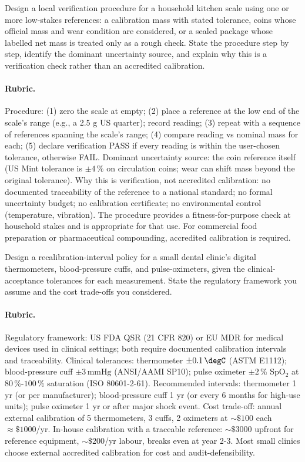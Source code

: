 \begin{exercise}
Design a local verification procedure for a household kitchen scale
using one or more low-stakes references: a calibration mass with
stated tolerance, coins whose official mass and wear condition are
considered, or a sealed package whose labelled net mass is treated
only as a rough check. State the procedure step by step, identify
the dominant uncertainty source, and explain why this is a
verification check rather than an accredited calibration.

\paragraph{Rubric.} Procedure: (1) zero the scale at empty; (2)
place a reference at the low end of the scale's range (e.g., a
2.5 g US quarter); record reading; (3) repeat with a sequence of
references spanning the scale's range; (4) compare reading vs
nominal mass for each; (5) declare verification PASS if every
reading is within the user-chosen tolerance, otherwise FAIL.
Dominant uncertainty source: the coin reference itself (US Mint
tolerance is $\pm 4\,\%$ on circulation coins; wear can shift mass
beyond the original tolerance). Why this is verification, not
accredited calibration: no documented traceability of the reference
to a national standard; no formal uncertainty budget; no
calibration certificate; no environmental control (temperature,
vibration). The procedure provides a fitness-for-purpose check at
household stakes and is appropriate for that use. For commercial
food preparation or pharmaceutical compounding, accredited
calibration is required.
\end{exercise}

\begin{exercise}
Design a recalibration-interval policy for a small dental clinic's
digital thermometers, blood-pressure cuffs, and pulse-oximeters,
given the clinical-acceptance tolerances for each measurement.
State the regulatory framework you assume and the cost trade-offs
you considered.

\paragraph{Rubric.} Regulatory framework: US FDA QSR (21 CFR 820)
or EU MDR for medical devices used in clinical settings; both
require documented calibration intervals and traceability.
Clinical tolerances: thermometer $\pm 0.1\,\degC$ (ASTM E1112);
blood-pressure cuff $\pm 3 \,\text{mmHg}$ (ANSI/AAMI SP10);
pulse oximeter $\pm 2\,\%$ SpO$_2$ at $80\,\%$-$100\,\%$ saturation
(ISO 80601-2-61). Recommended intervals: thermometer 1 yr (or per
manufacturer); blood-pressure cuff 1 yr (or every 6 months for
high-use units); pulse oximeter 1 yr or after major shock event.
Cost trade-off: annual external calibration of 5 thermometers,
3 cuffs, 2 oximeters at $\sim \$100$ each $\approx \$1000$/yr.
In-house calibration with a traceable reference: $\sim \$3000$
upfront for reference equipment, $\sim \$200$/yr labour, breaks
even at year 2-3. Most small clinics choose external accredited
calibration for cost and audit-defensibility.
\end{exercise}

